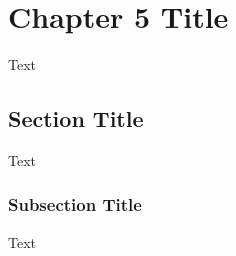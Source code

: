 \chapter{Chapter 5 Title}\label{chap5}
Text

\section{Section Title}  %
Text

\subsection{Subsection Title} %
Text